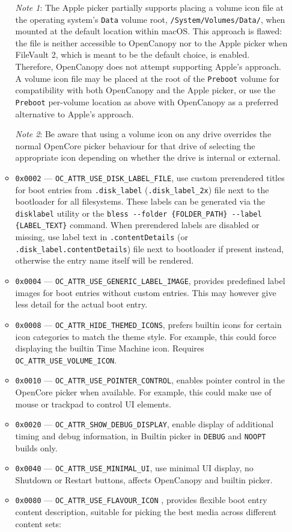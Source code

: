 \documentclass[]{article}
\makeatletter
\renewcommand{\label}[1]{%
\zref@wrapper@immediate{\oldlabel{#1}}}  %
\makeatother
\begin{document}
\begin{enumerate}
\begin{itemize}
    \emph{Note 1}: The Apple picker partially supports placing a volume icon file
    at the operating system's \texttt{Data} volume root, \texttt{/System/Volumes/Data/}, when
    mounted at the default location within macOS. This approach is flawed: the file is neither
    accessible to OpenCanopy nor to the Apple picker when FileVault 2, which is meant to be the
    default choice, is enabled. Therefore, OpenCanopy does not attempt supporting Apple's approach.
    A volume icon file may be placed at the root of the \texttt{Preboot} volume for compatibility
    with both OpenCanopy and the Apple picker, or use the \texttt{Preboot} per-volume location as
    above with OpenCanopy as a preferred alternative to Apple's approach. \medskip

    \emph{Note 2}: Be aware that using a volume icon on any drive overrides the normal
    OpenCore picker behaviour for that drive of selecting the appropriate icon depending
    on whether the drive is internal or external. \medskip

  \item \texttt{0x0002} --- \texttt{OC\_ATTR\_USE\_DISK\_LABEL\_FILE}, use custom
    prerendered titles for boot entries from \texttt{.disk\_label} (\texttt{.disk\_label\_2x})
    file next to the bootloader for all filesystems.
    These labels can be generated via the \texttt{disklabel} utility or the
    \texttt{bless -{}-folder \{FOLDER\_PATH\} -{}-label \{LABEL\_TEXT\}} command.
    When prerendered labels are disabled or missing, use label text in \texttt{.contentDetails}
    (or \texttt{.disk\_label.contentDetails}) file next to bootloader if present instead, otherwise
    the entry name itself will be rendered.
  \item \texttt{0x0004} --- \texttt{OC\_ATTR\_USE\_GENERIC\_LABEL\_IMAGE}, provides predefined
    label images for boot entries without custom entries. This may however give less detail for
    the actual boot entry.
  \item \texttt{0x0008} --- \texttt{OC\_ATTR\_HIDE\_THEMED\_ICONS}, prefers builtin icons
    for certain icon categories to match the theme style. For example, this could force
    displaying the builtin Time Machine icon. Requires \texttt{OC\_ATTR\_USE\_VOLUME\_ICON}.
  \item \texttt{0x0010} --- \texttt{OC\_ATTR\_USE\_POINTER\_CONTROL}, enables pointer control
  in the OpenCore picker when available. For example, this could make use of mouse or trackpad to
  control UI elements.
  \item \texttt{0x0020} --- \texttt{OC\_ATTR\_SHOW\_DEBUG\_DISPLAY}, enable display of additional
  timing and debug information, in Builtin picker in \texttt{DEBUG} and \texttt{NOOPT}
  builds only.
  \item \texttt{0x0040} --- \texttt{OC\_ATTR\_USE\_MINIMAL\_UI}, use minimal UI display, no
  Shutdown or Restart buttons, affects OpenCanopy and builtin picker.
  \item \texttt{0x0080} --- \texttt{OC\_ATTR\_USE\_FLAVOUR\_ICON}\label{oc-attr-use-flavour-icon},
  provides flexible boot entry content description, suitable for picking the best media across
  different content sets:


\end{itemize}
\end{enumerate}
\end{document}
